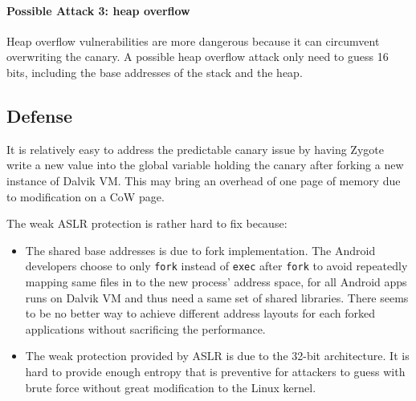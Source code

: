 \paragraph*{Possible Attack 3: heap overflow}

Heap overflow vulnerabilities are more dangerous because it can circumvent overwriting the canary. A possible heap overflow attack only need to guess 16 bits, including the base addresses of the stack and the heap.

\subsection{Defense}

It is relatively easy to address the predictable canary issue by having Zygote write a new value into the global variable holding the canary after forking a new instance of Dalvik VM. This may bring an overhead of one page of memory due to modification on a CoW page.

The weak ASLR protection is rather hard to fix because:
\begin{itemize}
\item The shared base addresses is due to fork implementation. The Android developers choose to only \verb|fork| instead of \verb|exec| after \verb|fork| to avoid repeatedly mapping same files in to the new process' address space, for all Android apps runs on Dalvik VM and thus need a same set of shared libraries. There seems to be no better way to achieve different address layouts for each forked applications without sacrificing the performance.

\item The weak protection provided by ASLR is due to the 32-bit architecture. It is hard to provide enough entropy that is preventive for attackers to guess with brute force without great modification to the Linux kernel. 

\end{itemize}

